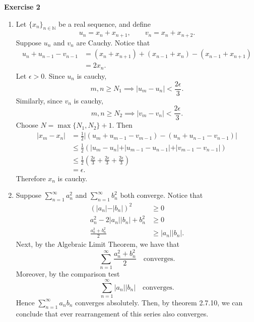 \documentclass[12pt]{article}
\begin{document}
\textbf{Exercise 2}
\begin{enumerate}[label=(\alph*)]
    \item Let \( \{x_n\}_{n \in \mathbb{N}} \) be a real sequence, and define
          \[
              u_n = x_n + x_{n+1}, \qquad v_n = x_n + x_{n+2}.
          \]
          Suppose \( u_n \) and \( v_n \) are Cauchy. Notice that
          \[
              \begin{split}
                  u_n + u_{n-1} - v_{n-1} & = (x_n + x_{n+1}) + (x_{n-1} + x_n) - (x_{n-1} + x_{n+1}) \\
                                          & = 2x_n.
              \end{split}
          \]
          Let \( \epsilon > 0 \). Since \( u_n \) is cauchy,
          \[
              m,n \geq N_1 \implies \vert u_m - u_n \vert < \frac{2\epsilon}{3}.
          \]
          Similarly, since \( v_n \) is cauchy,
          \[
              m,n \geq N_2 \implies \vert v_m - v_n \vert < \frac{2\epsilon}{3}.
          \]
          Choose \( N = \max{\{N_1, N_2\}} + 1 \). Then
          \[
              \begin{split}
                  \vert x_m - x_{n} \vert & = \frac{1}{2} \vert (u_m + u_{m-1} - v_{m-1}) - (u_n + u_{n-1} - v_{n-1}) \vert                                      \\
                                          & \leq \frac{1}{2} \left(\vert u_m - u_n \vert + \vert u_{m-1} - u_{n-1} \vert + \vert v_{m-1} - v_{n-1} \vert \right) \\
                                          & \leq \frac{1}{2} \left(\frac{2\epsilon}{3} + \frac{2\epsilon}{3} + \frac{2\epsilon}{3}\right)                        \\
                                          & = \epsilon.
              \end{split}
          \]
          Therefore \( x_n \) is cauchy.

    \item Suppose \( \sum_{n=1}^{\infty} a_n^2 \) and \( \sum_{n=1}^{\infty} b_n^2 \) both converge.
          Notice that
          \[
              \begin{split}
                  (\vert a_n \vert - \vert b_n \vert )^2            & \geq  0                                \\
                  a_n^2 - 2 \vert a_n \vert \vert b_n \vert + b_n^2 & \geq 0                                 \\
                  \frac{a_n^2 + b_n^2}{2}                           & \geq \vert a_n \vert \vert b_n \vert .
              \end{split}
          \]
          Next, by the Algebraic Limit Theorem, we have that
          \[
              \sum_{n=1}^{\infty} \frac{a_n^2 + b_n^2}{2} \quad \text{converges.}
          \]
          Moreover, by the comparison test
          \[
              \sum_{n=1}^{\infty} \vert a_n \vert \vert b_n \vert \quad \text{converges.}
          \]
          Hence \( \sum_{n=1}^{\infty}  a_n b_n \) converges absolutely.
          Then, by theorem 2.7.10, we can conclude that ever rearrangement of this series also converges.
\end{enumerate}
\end{document}
